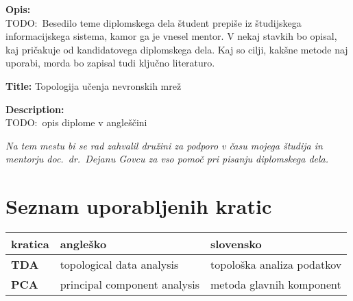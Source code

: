 \bigskip
\noindent\textbf{Opis:}\\
TODO:\ Besedilo teme diplomskega dela študent prepiše iz študijskega informacijskega sistema, kamor ga je vnesel mentor.
V nekaj stavkih bo opisal, kaj pričakuje od kandidatovega diplomskega dela.
Kaj so cilji, kakšne metode naj uporabi, morda bo zapisal tudi ključno literaturo.

\bigskip
\noindent\textbf{Title:} Topologija učenja nevronskih mrež

\bigskip
\noindent\textbf{Description:}\\
TODO:\ opis diplome v angleščini

\vfill



\vspace{2cm}

\clearemptydoublepage{}

\thispagestyle{empty}\mbox{}\vfill\null\it%
\noindent
Na tem mestu bi se rad zahvalil družini za podporo v času mojega študija in mentorju doc.\ dr.\ Dejanu Govcu za vso pomoč pri pisanju diplomskega dela.
\rm\normalfont{}

\clearemptydoublepage{}

\clearemptydoublepage{}


\pagestyle{empty}
\def\thepage{}%
\tableofcontents{}


\clearemptydoublepage{}

\chapter*{Seznam uporabljenih kratic}

\noindent\begin{tabular}{p{}|p{}|p{}}    %
  {\bf kratica} & {\bf angleško}               & {\bf slovensko}            \\ \hline
  {\bf TDA}     & topological data analysis    & topološka analiza podatkov \\
  {\bf PCA}     & principal component analysis & metoda glavnih komponent   \\

\end{tabular}


